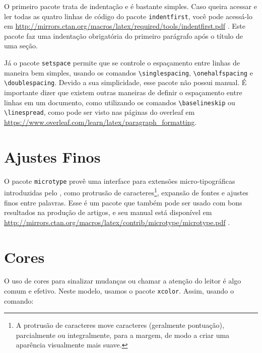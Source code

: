 

O primeiro pacote trata de indentação e é bastante simples. Caso queira acessar e ler todas as quatro linhas de código do pacote \texttt{indentfirst}, você pode acessá-lo em \url{http://mirrors.ctan.org/macros/latex/required/tools/indentfirst.pdf} \parencite{indentfirst}. Este pacote faz uma indentação obrigatória do primeiro parágrafo após o título de uma seção.

Já o pacote \texttt{setspace} permite que se controle o espaçamento entre linhas de maneira bem simples, usando os comandos \texttt{\textbackslash singlespacing}, \texttt{\textbackslash onehalfspacing} e \texttt{\textbackslash doublespacing}. Devido a sua simplicidade, esse pacote não possui manual. É importante dizer que existem outras maneiras de definir o espaçamento entre linhas em um documento, como utilizando os comandos \texttt{\textbackslash baselineskip} ou \texttt{\textbackslash linespread}, como pode ser visto nas páginas do \gls{overleaf} em \url{https://www.overleaf.com/learn/latex/paragraph_formatting}.

\section{Ajustes Finos}
O pacote \texttt{microtype} provê uma interface para extensões micro-tipográficas introduzidas pelo , como protrusão de caracteres\footnote{A protrusão de caracteres move caracteres (geralmente pontuação), parcialmente ou integralmente, para a margem, de modo a criar uma aparência visualmente mais suave.}, expansão de fontes e ajustes finos entre palavras. Esse é um pacote que também pode ser usado com bons resultados na produção de artigos, e seu manual está disponível em \url{http://mirrors.ctan.org/macros/latex/contrib/microtype/microtype.pdf} \parencite{microtype}.

\section{Cores}

O uso de cores para sinalizar mudanças ou chamar a atenção do leitor é algo comum e efetivo. Neste modelo, usamos o pacote \texttt{xcolor}. Assim, usando o comando: 


